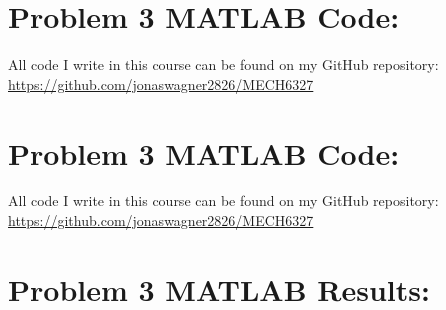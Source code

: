 \documentclass[letter]{article}
\begin{document}
\newpage
\section{Problem 3 MATLAB Code:}\label{apx:pblm2_matlab}
All code I write in this course can be found on my GitHub repository:\\
\href{https://github.com/jonaswagner2826/MECH6327}{https://github.com/jonaswagner2826/MECH6327}


\newpage
\section{Problem 3 MATLAB Code:}\label{apx:pblm3_matlab}
All code I write in this course can be found on my GitHub repository:\\
\href{https://github.com/jonaswagner2826/MECH6327}{https://github.com/jonaswagner2826/MECH6327}


\newpage
\section{Problem 3 MATLAB Results:}\label{apx:pblm3_results}
\end{document}

